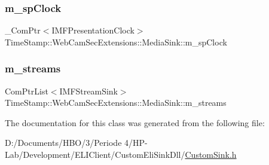 \subsubsection{\texorpdfstring{m\+\_\+sp\+Clock}{m\_spClock}}
{\footnotesize\ttfamily \+\_\+\+Com\+Ptr$<$I\+M\+F\+Presentation\+Clock$>$ Time\+Stamp\+::\+Web\+Cam\+Sec\+Extensions\+::\+Media\+Sink\+::m\+\_\+sp\+Clock\hspace{0.3cm}{\ttfamily [private]}}

\mbox{\label{class_time_stamp_1_1_web_cam_sec_extensions_1_1_media_sink_a362055699c2559630e03dc78a16c6e34}} 
\subsubsection{\texorpdfstring{m\+\_\+streams}{m\_streams}}
{\footnotesize\ttfamily Com\+Ptr\+List$<$I\+M\+F\+Stream\+Sink$>$ Time\+Stamp\+::\+Web\+Cam\+Sec\+Extensions\+::\+Media\+Sink\+::m\+\_\+streams\hspace{0.3cm}{\ttfamily [private]}}



The documentation for this class was generated from the following file\+:\begin{DoxyCompactItemize}
\item 
D\+:/\+Documents/\+H\+B\+O/3/\+Periode 4/\+H\+P-\/\+Lab/\+Development/\+E\+L\+I\+Client/\+Custom\+Eli\+Sink\+Dll/\hyperlink{_custom_sink_8h}{Custom\+Sink.\+h}\end{DoxyCompactItemize}
